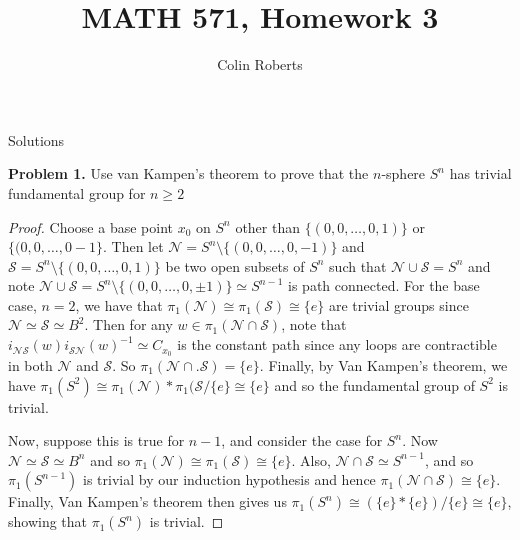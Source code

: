 \documentclass[leqno]{article}
\author{Colin Roberts}
\title{MATH 571, Homework 3}
\theoremstyle{nonumberplain}
\newtheorem{proof}{Proof}
\begin{document}
\maketitle
\begin{large}
\begin{center}
Solutions
\end{center}
\end{large}


\noindent\textbf{Problem 1.} Use van Kampen's theorem to prove that the $n$-sphere $S^n$ has trivial fundamental group for $n\ge 2$

\begin{proof}
Choose a base point $x_0$ on $S^n$ other than $\{(0,0,\dots,0,1)\}$ or $\{(0,0,\dots,0-1\}$. Then let $\mathcal{N} = S^n \setminus \{(0,0,\dots,0,-1)\}$ and $\mathcal{S}=S^n \setminus \{(0,0,\dots,0,1)\}$ be two open subsets of $S^n$ such that $\mathcal{N}\cup \mathcal{S}=S^n$ and note $\mathcal{N}\cup \mathcal{S} = S^n \setminus \{(0,0,\dots,0,\pm 1 )\} \simeq S^{n-1}$ is path connected. For the base case, $n=2$, we have that $\pi_1 (\mathcal{N}) \cong \pi_1 (\mathcal{S}) \cong \{e\}$ are trivial groups since $\mathcal{N}\simeq \mathcal{S} \simeq B^2$.  Then for any $w\in \pi_1(\mathcal{N}\cap \mathcal{S})$, note that $i_{\mathcal{NS}}(w)i_{\mathcal{SN}}(w)^{-1} \simeq C_{x_0}$ is the constant path since any loops are contractible in both $\mathcal{N}$ and $\mathcal{S}$. So $\pi_1 ( \mathcal{N}\cap.\mathcal{S} ) = \{e\}$.  Finally, by Van Kampen's theorem, we have $\pi_1 (S^2) \cong \pi_1(\mathcal{N})\ast \pi_1(\mathcal{S}/\{e\}\cong \{e\}$ and so the fundamental group of $S^2$ is trivial.

Now, suppose this is true for $n-1$, and consider the case for $S^n$.  Now $\mathcal{N}\simeq \mathcal{S} \simeq B^{n}$ and so $\pi_1(\mathcal{N})\cong \pi_1(\mathcal{S}) \cong \{e\}$.  Also, $\mathcal{N}\cap \mathcal{S}\simeq S^{n-1}$, and so $\pi_1(S^{n-1})$ is trivial by our induction hypothesis and hence $\pi_1(\mathcal{N}\cap \mathcal{S})\cong \{e\}$.  Finally, Van Kampen's theorem then gives us $\pi_1(S^n)\cong (\{e\}\ast \{e\})/\{e\} \cong \{e\}$, showing that $\pi_1(S^n)$ is trivial.
\end{proof}
\end{document}
